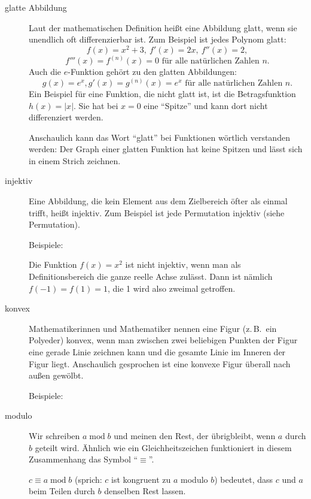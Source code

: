 \documentclass[10pt,a5paper,twoside]{article}
\begin{document}
\begin{description}
\item[glatte Abbildung] Laut der mathematischen Definition heißt eine Abbildung glatt, wenn sie unendlich oft differenzierbar ist. 
Zum \nopagebreak Beispiel ist jedes Polynom glatt: 
\[f(x) = x^2 + 3,\ f'(x) = 2x,\ f''(x) = 2, \]
\[f'''(x) = f^{(n)}(x) = 0 \text{ für alle natürlichen Zahlen } n.\]
Auch die $e$-Funktion gehört zu den glatten Abbildungen: 
\[g(x) = e^x, g'(x) = g^{(n)}(x) = e^x \text{ für alle natürlichen Zahlen } n.\]
Ein Beispiel für eine Funktion, die nicht glatt ist, ist die Betragsfunktion $h(x) = |x|.$ Sie hat bei $x=0$ eine \enquote{Spitze} und kann dort nicht differenziert werden. 

Anschaulich kann das Wort \enquote{glatt} bei Funktionen wörtlich verstanden werden: Der Graph einer glatten Funktion hat keine Spitzen und lässt sich in einem Strich zeichnen. 

\item[injektiv] Eine Abbildung, die kein Element aus dem Zielbereich öfter als einmal trifft, heißt injektiv. 
Zum Beispiel ist jede Permutation injektiv (siehe Permutation). 

Beispiele: 
\begin{figure}[H] 
\centering 
\def\svgwidth{200pt} 
 
\end{figure}
Die Funktion $f(x) = x^2$ ist nicht injektiv, wenn man als Definitionsbereich die ganze reelle Achse zulässt. Dann ist nämlich $f(-1) = f(1) = 1$, die 1 wird also zweimal getroffen. 

\item[konvex] Mathematikerinnen und Mathematiker nennen eine Figur (z.\,B.\ ein Polyeder) konvex, wenn man zwischen zwei beliebigen Punkten der Figur eine gerade Linie zeichnen kann und die gesamte Linie im Inneren der Figur liegt. 
Anschaulich gesprochen ist eine konvexe Figur überall nach außen gewölbt. 

Beispiele: 
\begin{figure}[H] 
\centering 
\def\svgwidth{270pt} 
 
\end{figure} 

\item[modulo] Wir schreiben $a \operatorname{mod} b$ und meinen den Rest, der übrigbleibt, wenn $a$ durch $b$ geteilt wird. 
Ähnlich wie ein Gleichheitszeichen funktioniert in diesem Zusammenhang das Symbol \enquote{$\equiv$}. 

$c\equiv a \operatorname{mod} b$ (sprich: $c$ ist kongruent zu $a$ modulo $b$) bedeutet, dass $c$ und $a$ beim Teilen durch $b$ denselben Rest lassen. 


\end{description}
\end{document}
